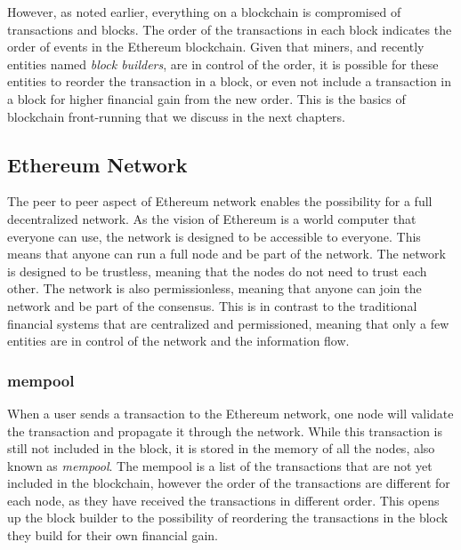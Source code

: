 However, as noted earlier, everything on a blockchain is compromised of transactions and blocks. The order of the transactions in each block indicates the order of events in the Ethereum blockchain. Given that miners, and recently entities named \textit{block builders}, are in control of the order, it is possible for these entities to reorder the transaction in a block, or even not include a transaction in a block for higher financial gain from the new order. This is the basics of blockchain front-running that we discuss in the next chapters. 


\subsection{Ethereum Network}
The peer to peer aspect of Ethereum network enables the possibility for a full decentralized network. As the vision of Ethereum is a world computer that everyone can use, the network is designed to be accessible to everyone. This means that anyone can run a full node and be part of the network. The network is designed to be trustless, meaning that the nodes do not need to trust each other. The network is also permissionless, meaning that anyone can join the network and be part of the consensus. This is in contrast to the traditional financial systems that are centralized and permissioned, meaning that only a few entities are in control of the network and the information flow.


\subsubsection{mempool}
When a user sends a transaction to the Ethereum network, one node will validate the transaction and propagate it through the network. While this transaction is still not included in the block, it is stored in the memory of all the nodes, also known as \textit{mempool}. The mempool is a list of the transactions that are not yet included in the blockchain, however the order of the transactions are different for each node, as they have received the transactions in different order. This opens up the block builder to the possibility of reordering the transactions in the block they build for their own financial gain.


